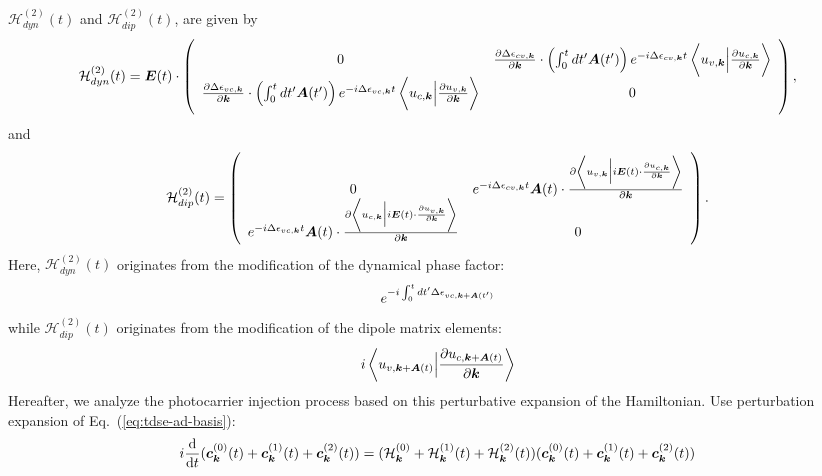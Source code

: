 $\mathcal{H}^{(2)}_{dyn}(t)$ and $\mathcal{H}^{(2)}_{dip}(t)$, are given by
\begin{align}
\mathcal{H}^{(2)}_{dyn}(t) =   \boldsymbol E(t)\cdot 
\left(
    \begin{array}{cc}
      0 & 
      \frac{\partial \Delta \epsilon_{cv,\boldsymbol k}}{\partial \boldsymbol k}\cdot \left ( \int^t_0 dt' \boldsymbol A(t') \right )e^{-i \Delta \epsilon_{cv,\boldsymbol k}t} 
  \left \langle u_{v,\boldsymbol k}\Big |\frac{\partial u_{c,\boldsymbol k}}{\partial \boldsymbol k} \right \rangle \\
  \frac{\partial \Delta \epsilon_{vc,\boldsymbol k}}{\partial \boldsymbol k} \cdot \left ( \int^t_0dt' \boldsymbol A(t')\right )e^{-i\Delta \epsilon_{vc,\boldsymbol k}t}
  \left \langle u_{c,\boldsymbol k}\Big |\frac{\partial u_{v,\boldsymbol k}}{\partial \boldsymbol k} \right \rangle &
      0
    \end{array}
    \right),
\end{align}
and 
\begin{align}
\mathcal{H}^{(2)}_{dip}(t) =  
\left(
    \begin{array}{cc}
      0 & 
      e^{-i \Delta \epsilon_{cv,\boldsymbol k}t} 
      \boldsymbol A(t) \cdot \frac{\partial 
  \left \langle u_{v,\boldsymbol k}\Big |i \boldsymbol E(t)\cdot  \frac{\partial u_{c,\boldsymbol k}}{\partial \boldsymbol k} \right \rangle 
 }{\partial \boldsymbol k} 
\\
      e^{-i\Delta \epsilon_{vc,\boldsymbol k}t}
      \boldsymbol A(t) \cdot \frac{\partial
  \left \langle u_{c,\boldsymbol k}\Big |i \boldsymbol E(t)\cdot \frac{\partial u_{v,\boldsymbol k}}{\partial \boldsymbol k} \right \rangle
}{\partial \boldsymbol k} 
 &
      0
    \end{array}
    \right).
\end{align}
Here, $\mathcal{H}^{(2)}_{dyn}(t)$ originates from the modification of the dynamical phase factor:
\begin{align}
e^{-i\int^t_0dt' \Delta \epsilon_{vc,\boldsymbol k+ \boldsymbol A(t')}}  
\end{align}
while $\mathcal{H}^{(2)}_{dip}(t)$ originates from the modification of the dipole matrix elements:
\begin{align}
i\left \langle u_{v,\boldsymbol k+\boldsymbol A(t)}\Big |\frac{\partial u_{c,\boldsymbol k+\boldsymbol A(t)}}{\partial \boldsymbol k} \right \rangle    
\end{align}
Hereafter, we analyze the photocarrier injection process based on this perturbative expansion of the Hamiltonian. Use perturbation expansion of Eq.~(\ref{eq:tdse-ad-basis}):
\begin{align}
i\frac{\mathrm{d}  }{\mathrm{d} t} (\boldsymbol c^{(0)}_{\boldsymbol k}(t)+\boldsymbol c^{(1)}_{\boldsymbol k}(t)+\boldsymbol c^{(2)}_{\boldsymbol k}(t))=(\mathcal{H}^{(0)}_{\boldsymbol k}+\mathcal{H}^{(1)}_{\boldsymbol k}(t)+\mathcal{H}^{(2)}_{\boldsymbol k}(t)) (\boldsymbol c^{(0)}_{\boldsymbol k}(t)+\boldsymbol c^{(1)}_{\boldsymbol k}(t)+\boldsymbol c^{(2)}_{\boldsymbol k}(t))
\label{perturbative}
\end{align}
